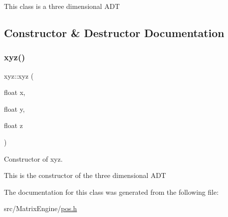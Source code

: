 This class is a three dimensional A\+DT 

\subsection{Constructor \& Destructor Documentation}
\mbox{\label{classxyz_a1ae38c73f1c13a1987bb93ee6329ddf4}} 
\subsubsection{\texorpdfstring{xyz()}{xyz()}}
{\footnotesize\ttfamily xyz\+::xyz (\begin{DoxyParamCaption}\item[{float}]{x,  }\item[{float}]{y,  }\item[{float}]{z }\end{DoxyParamCaption})\hspace{0.3cm}{\ttfamily [inline]}}



Constructor of xyz. 

This is the constructor of the three dimensional A\+DT 

The documentation for this class was generated from the following file\+:\begin{DoxyCompactItemize}
\item 
src/\+Matrix\+Engine/\hyperlink{pos_8h}{pos.\+h}\end{DoxyCompactItemize}
